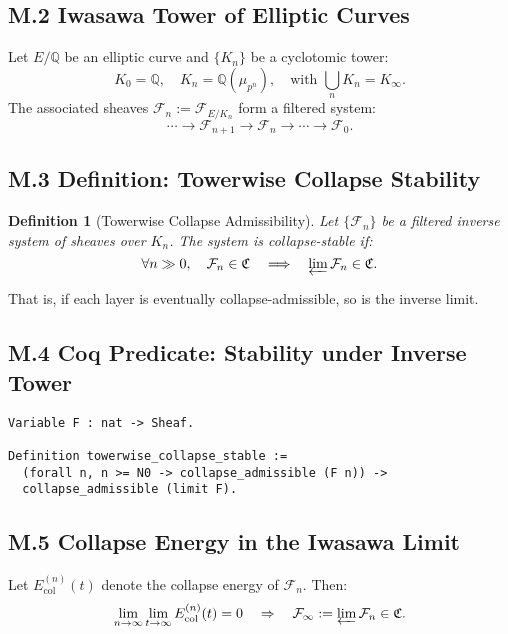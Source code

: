 \documentclass[11pt]{article}
\newtheorem{definition}[theorem]{Definition}
\begin{document}
\subsection*{M.2 Iwasawa Tower of Elliptic Curves}

Let \( E/\mathbb{Q} \) be an elliptic curve and \( \{K_n\} \) be a cyclotomic tower:
\[
K_0 = \mathbb{Q}, \quad K_n = \mathbb{Q}(\mu_{p^n}), \quad \text{with } \bigcup_{n} K_n = K_{\infty}.
\]
The associated sheaves \( \mathcal{F}_n := \mathcal{F}_{E/K_n} \) form a filtered system:
\[
\cdots \rightarrow \mathcal{F}_{n+1} \rightarrow \mathcal{F}_n \rightarrow \cdots \rightarrow \mathcal{F}_0.
\]

\subsection*{M.3 Definition: Towerwise Collapse Stability}

\begin{definition}[Towerwise Collapse Admissibility]
Let \( \{ \mathcal{F}_n \} \) be a filtered inverse system of sheaves over \( K_n \). The system is \emph{collapse-stable} if:
\[
\forall n \gg 0, \quad \mathcal{F}_n \in \mathfrak{C} \quad \Longrightarrow \quad \varprojlim \mathcal{F}_n \in \mathfrak{C}.
\]
\end{definition}

That is, if each layer is eventually collapse-admissible, so is the inverse limit.

\subsection*{M.4 Coq Predicate: Stability under Inverse Tower}
\begin{lstlisting}[language=Coq]
Variable F : nat -> Sheaf.

Definition towerwise_collapse_stable :=
  (forall n, n >= N0 -> collapse_admissible (F n)) ->
  collapse_admissible (limit F).
\end{lstlisting}

\subsection*{M.5 Collapse Energy in the Iwasawa Limit}

Let \( E_{\mathrm{col}}^{(n)}(t) \) denote the collapse energy of \( \mathcal{F}_n \). Then:
\[
\lim_{n \to \infty} \lim_{t \to \infty} E_{\mathrm{col}}^{(n)}(t) = 0
\quad \Rightarrow \quad
\mathcal{F}_{\infty} := \varprojlim \mathcal{F}_n \in \mathfrak{C}.
\]
\end{document}
